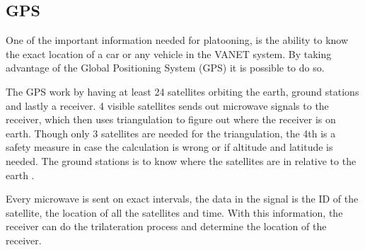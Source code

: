 \subsection{GPS}
One of the important information needed for platooning, is the ability to know the exact location of a car or any vehicle in the VANET system. By taking advantage of the Global Positioning System (GPS) it is possible to do so.\par
% 
% 
The GPS work by having at least 24 satellites orbiting the earth, ground stations and lastly a receiver. 4 visible satellites sends out microwave signals to the receiver, which then uses triangulation to figure out where the receiver is on earth. Though only 3 satellites are needed for the triangulation, the 4th is a safety measure in case the calculation is wrong or if altitude and latitude is needed. The ground stations is to know where the satellites are in relative to the earth \cite{MiTACIntl.2011HowWork}.\par
% 
% 
Every microwave is sent on exact intervals, the data in the signal is the ID of the satellite, the location of all the satellites and time. With this information, the receiver can do the trilateration process and determine the location of the receiver.